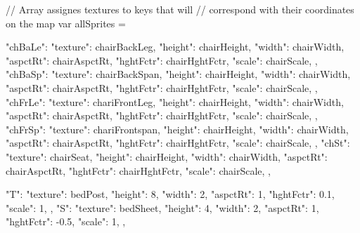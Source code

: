 // Array assignes textures to keys that will
// correspond with their coordinates on the map
var allSprites = {
  "chBaLe": {
    "texture": chairBackLeg,
    "height": chairHeight,
    "width": chairWidth,
    "aspctRt": chairAspctRt,
    "hghtFctr": chairHghtFctr,
    "scale": chairScale,
  },  
  "chBaSp": {
    "texture": chairBackSpan,
    "height": chairHeight,
    "width": chairWidth,
    "aspctRt": chairAspctRt,
    "hghtFctr": chairHghtFctr,
    "scale": chairScale,
  },
  "chFrLe": {
    "texture": chariFrontLeg,
    "height": chairHeight,
    "width": chairWidth,
    "aspctRt": chairAspctRt,
    "hghtFctr": chairHghtFctr,
    "scale": chairScale,
  },
  "chFrSp": {
    "texture": chariFrontspan,
    "height": chairHeight,
    "width": chairWidth,
    "aspctRt": chairAspctRt,
    "hghtFctr": chairHghtFctr,
    "scale": chairScale,
  },
  "chSt": {
    "texture": chairSeat,
    "height": chairHeight,
    "width": chairWidth,
    "aspctRt": chairAspctRt,
    "hghtFctr": chairHghtFctr,
    "scale": chairScale,
  },

  "T": {
    "texture": bedPost,
    "height": 8,
    "width": 2,
    "aspctRt": 1,
    "hghtFctr": 0.1,
    "scale": 1,
  },  
  "S": {
    "texture": bedSheet,
    "height": 4,
    "width": 2,
    "aspctRt": 1,
    "hghtFctr": -0.5,
    "scale": 1,
  },

}
